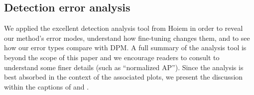 \subsection{Detection error analysis}
We applied the excellent detection analysis tool from Hoiem \etal
\cite{hoiem2012diagnosing} in order to reveal our
method's error modes, understand how fine-tuning changes them, and
to see how our error types compare with DPM.  A full summary of the
analysis tool is beyond the scope of this paper and we encourage readers to consult \cite{hoiem2012diagnosing} to
understand some finer details (such as ``normalized AP''). Since the
analysis is best absorbed in the context of the associated plots, we
present the discussion within the captions of 
and .
